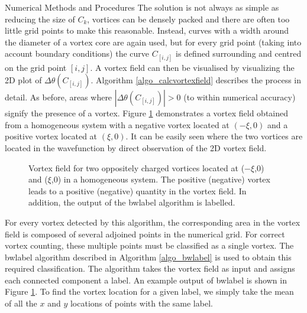 \begin{chapter}{\label{cha:numerics}Numerical Methods and Procedures}
The solution is not always as simple as reducing the size of $C_k$, vortices can be densely packed and there are often too little grid points to make this reasonable. Instead, curves with a width around the diameter of a vortex core are again used, but for every grid point (taking into account boundary conditions) the curve $C_{[i,j]}$ is defined surrounding and centred on the grid point $[i,j]$. A vortex field can then be visualised by visualizing the 2D plot of $\Delta\theta(C_{[i,j]})$. Algorithm \ref{algo_calcvortexfield} describes the process in detail. As before, areas where $|\Delta\theta(C_{[i,j]})| > 0$ (to within numerical accuracy) signify the presence of a vortex. Figure \ref{fig:vortexfield} demonstrates a vortex field obtained from a homogeneous system with a negative vortex located at $(-\xi,0)$ and a positive vortex located at $(\xi,0)$. It can be easily seen where the two vortices are located in the wavefunction by direct observation of the 2D vortex field.
\begin{figure}
  \centering
  \caption{Vortex field for two oppositely charged vortices located at ($-\xi$,0) and ($\xi$,0) in a homogeneous system. The positive (negative) vortex leads to a positive (negative) quantity in the vortex field. In addition, the output of the bwlabel algorithm is labelled.\label{fig:vortexfield}}
 \end{figure}

For every vortex detected by this algorithm, the corresponding area in the vortex field is composed of several adjoined points in the numerical grid. For correct vortex counting, these multiple points must be classified as a single vortex. The bwlabel algorithm described in Algorithm \ref{algo_bwlabel} is used to obtain this required classification. The algorithm takes the vortex field as input and assigns each connected component a label. An example output of bwlabel is shown in Figure \ref{fig:vortexfield}. To find the vortex location for a given label, we simply take the mean of all the $x$ and $y$ locations of points with the same label.


\end{chapter}
